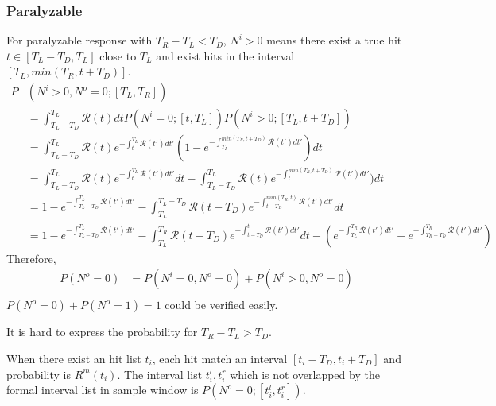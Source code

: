 \subsubsection{Paralyzable}
For paralyzable response with $T_R-T_L<T_D$, $N^i>0$ means there exist a true hit $t\in[T_L-T_D,T_L]$ close to $T_L$ and exist hits in the interval $[T_L, min(T_R,t+T_D)]$.
\begin{equation}
\begin{aligned}
P&(N^i>0,N^o=0;[T_L,T_R])\\
&=\int_{T_L-T_D}^{T_L}{\mathcal{R}(t)dt P(N^i=0;[t,T_L])P(N^i>0;[T_L,t+T_D])}\\
&=\int_{T_L-T_D}^{T_L}{\mathcal{R}(t)e^{-\int_{t}^{T_L}{\mathcal{R}(t')dt'}}(1-e^{-\int_{T_L}^{min(T_R,t+T_D)}{\mathcal{R}(t')dt'}})dt}\\
&=\int_{T_L-T_D}^{T_L}{\mathcal{R}(t)e^{-\int_{t}^{T_L}{\mathcal{R}(t')dt'}}dt}-\int_{T_L-T_D}^{T_L}{\mathcal{R}(t)e^{-\int_{t}^{min(T_R,t+T_D)}{\mathcal{R}(t')dt'}})dt}\\
&=1-e^{-\int_{T_L-T_D}^{T_L}{\mathcal{R}(t')dt'}}-\int_{T_L}^{T_L+T_D}{\mathcal{R}(t-T_D)e^{-\int_{t-T_D}^{min(T_R,t)}{\mathcal{R}(t')dt'}}dt}\\
&=1-e^{-\int_{T_L-T_D}^{T_L}{\mathcal{R}(t')dt'}}-\int_{T_L}^{T_R}{\mathcal{R}(t-T_D)e^{-\int_{t-T_D}^{t}{\mathcal{R}(t')dt'}}dt} -(e^{-\int_{T_L}^{T_R}{\mathcal{R}(t')dt'}}-e^{-\int_{T_R-T_D}^{T_R}{\mathcal{R}(t')dt'}})
\end{aligned}
\end{equation}
Therefore, 
\begin{equation}
\begin{aligned}
P(N^o=0) &= P(N^i=0,N^o=0)+P(N^i>0,N^o=0)\\
\end{aligned}
\end{equation}
$P(N^o=0)+P(N^o=1)=1$ could be verified easily.

It is hard to express the probability for $T_R-T_L>T_D$.

When there exist an hit list ${t_i}$, each hit match an interval ${[t_i-T_D,t_i+T_D]}$ and probability is $R^m(t_i)$. The interval list ${t_i^l,t_i^r}$ which is not overlapped by the formal interval list in sample window is $P(N^o=0;[t_i^l,t_i^r])$.

